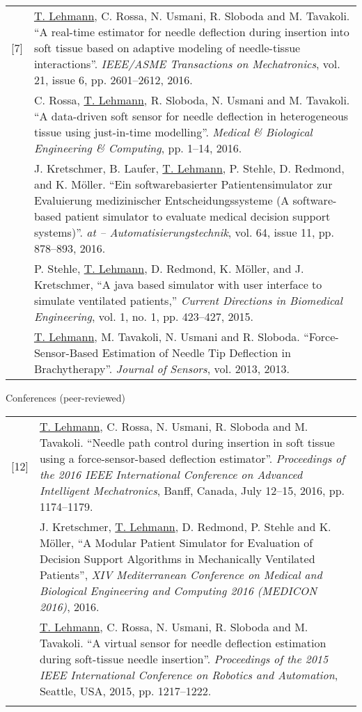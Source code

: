 \begin{cventries}
{\begin{longtable}{p{0.5cm} p{\textwidth - 0.5cm}}
        [7] & \underline{T. Lehmann}, C. Rossa, N. Usmani, R. Sloboda and M. Tavakoli. ``A real-time estimator for needle deflection during insertion into soft tissue based on adaptive modeling of needle-tissue interactions''. \emph{IEEE/ASME Transactions on Mechatronics}, vol. 21, issue 6, pp. 2601--2612, 2016. \\\relax
        [8] & C. Rossa, \underline{T. Lehmann}, R. Sloboda, N. Usmani and M. Tavakoli. ``A data-driven soft sensor for needle deflection in heterogeneous tissue using just-in-time modelling''. \emph{Medical \& Biological Engineering \& Computing}, pp. 1--14, 2016. \\\relax
        [9] & J. Kretschmer, B. Laufer, \underline{T. Lehmann}, P. Stehle, D. Redmond, and K. M\"oller. ``Ein softwarebasierter Patientensimulator zur Evaluierung medizinischer Entscheidungssysteme (A software-based patient simulator to evaluate medical decision support systems)''. \emph{at -- Automatisierungstechnik}, vol. 64, issue 11, pp. 878--893, 2016. \\\relax
        [10] & P. Stehle, \underline{T. Lehmann}, D. Redmond, K. M\"{o}ller, and J. Kretschmer, ``A java based simulator with user interface to simulate ventilated patients,'' \emph{Current Directions in Biomedical Engineering}, vol. 1, no. 1, pp. 423--427, 2015. \\\relax
        [11] & \underline{T. Lehmann}, M. Tavakoli, N. Usmani and R. Sloboda. ``Force-Sensor-Based Estimation of Needle Tip Deflection in Brachytherapy''. \emph{Journal of Sensors}, vol. 2013, 2013.
    \end{longtable}
  }
  \cvpub
    {Conferences (peer-reviewed)}{
      \begin{longtable}{p{0.5cm} p{\textwidth - 0.5cm}}
        [12] & \underline{T. Lehmann}, C. Rossa, N. Usmani, R. Sloboda and M. Tavakoli. ``Needle path control during insertion in soft tissue using a force-sensor-based deflection estimator''. \emph{Proceedings of the 2016 IEEE International Conference on Advanced Intelligent Mechatronics}, Banff, Canada, July 12--15, 2016, pp. 1174--1179. \\\relax
        [13] & J. Kretschmer, \underline{T. Lehmann}, D. Redmond, P. Stehle and K. M\"oller, ``A Modular Patient Simulator for Evaluation of Decision Support Algorithms in Mechanically Ventilated Patients'', \emph{XIV Mediterranean Conference on Medical and Biological Engineering and Computing 2016 (MEDICON 2016)}, 2016. \\\relax
        [14] & \underline{T. Lehmann}, C. Rossa, N. Usmani, R. Sloboda and M. Tavakoli. ``A virtual sensor for needle deflection estimation during soft-tissue needle insertion''.  \emph{Proceedings of the 2015 IEEE International Conference on Robotics and Automation}, Seattle, USA, 2015, pp. 1217--1222. \\\relax

\end{longtable}}
\end{cventries}
